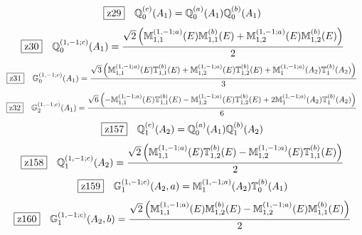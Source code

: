 \documentclass[fleqn,10pt,landscape]{jsarticle}
\begin{document}
\begin{dmath*}
\hspace*{3mm}\fbox{z29}\quad \mathbb{Q}_{0}^{(c)}(A_{1})=\mathbb{Q}_{0}^{(a)}(A_{1}) \mathbb{Q}_{0}^{(b)}(A_{1})
\end{dmath*}
\begin{dmath*}
\hspace*{3mm}\fbox{z30}\quad \mathbb{Q}_{0}^{(1,-1;c)}(A_{1})=\frac{\sqrt{2} \left(\mathbb{M}_{1,1}^{(1,-1;a)}(E) \mathbb{M}_{1,1}^{(b)}(E) + \mathbb{M}_{1,2}^{(1,-1;a)}(E) \mathbb{M}_{1,2}^{(b)}(E)\right)}{2}
\end{dmath*}
\begin{dmath*}
\hspace*{3mm}\fbox{z31}\quad \mathbb{G}_{0}^{(1,-1;c)}(A_{1})=\frac{\sqrt{3} \left(\mathbb{M}_{1,1}^{(1,-1;a)}(E) \mathbb{T}_{1,1}^{(b)}(E) + \mathbb{M}_{1,2}^{(1,-1;a)}(E) \mathbb{T}_{1,2}^{(b)}(E) + \mathbb{M}_{1}^{(1,-1;a)}(A_{2}) \mathbb{T}_{1}^{(b)}(A_{2})\right)}{3}
\end{dmath*}
\begin{dmath*}
\hspace*{3mm}\fbox{z32}\quad \mathbb{G}_{2}^{(1,-1;c)}(A_{1})=\frac{\sqrt{6} \left(- \mathbb{M}_{1,1}^{(1,-1;a)}(E) \mathbb{T}_{1,1}^{(b)}(E) - \mathbb{M}_{1,2}^{(1,-1;a)}(E) \mathbb{T}_{1,2}^{(b)}(E) + 2 \mathbb{M}_{1}^{(1,-1;a)}(A_{2}) \mathbb{T}_{1}^{(b)}(A_{2})\right)}{6}
\end{dmath*}
\begin{dmath*}
\hspace*{3mm}\fbox{z157}\quad \mathbb{Q}_{1}^{(c)}(A_{2})=\mathbb{Q}_{0}^{(a)}(A_{1}) \mathbb{Q}_{1}^{(b)}(A_{2})
\end{dmath*}
\begin{dmath*}
\hspace*{3mm}\fbox{z158}\quad \mathbb{Q}_{1}^{(1,-1;c)}(A_{2})=\frac{\sqrt{2} \left(\mathbb{M}_{1,1}^{(1,-1;a)}(E) \mathbb{T}_{1,2}^{(b)}(E) - \mathbb{M}_{1,2}^{(1,-1;a)}(E) \mathbb{T}_{1,1}^{(b)}(E)\right)}{2}
\end{dmath*}
\begin{dmath*}
\hspace*{3mm}\fbox{z159}\quad \mathbb{G}_{1}^{(1,-1;c)}(A_{2},a)=\mathbb{M}_{1}^{(1,-1;a)}(A_{2}) \mathbb{T}_{0}^{(b)}(A_{1})
\end{dmath*}
\begin{dmath*}
\hspace*{3mm}\fbox{z160}\quad \mathbb{G}_{1}^{(1,-1;c)}(A_{2},b)=\frac{\sqrt{2} \left(\mathbb{M}_{1,1}^{(1,-1;a)}(E) \mathbb{M}_{1,2}^{(b)}(E) - \mathbb{M}_{1,2}^{(1,-1;a)}(E) \mathbb{M}_{1,1}^{(b)}(E)\right)}{2}
\end{dmath*}
\end{document}
